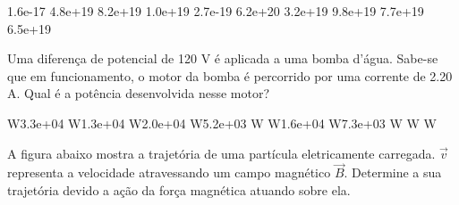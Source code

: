 \documentclass[12pt, addpoints]{exam}
\begin{document}
\begin{questions}
\begin{multicols*}{2}
\begin{oneparchoices}
\choice 1.6e-17 \choice 4.8e+19 \choice 8.2e+19 \choice 1.0e+19 \choice 2.7e-19 \choice 6.2e+20 \choice 3.2e+19 \choice 9.8e+19 \choice 7.7e+19 \choice 6.5e+19 
\end{oneparchoices}\question Uma diferença de potencial de 120 V é aplicada a uma bomba d’água. Sabe-se que em funcionamento, o motor da bomba é percorrido por uma corrente de    2.20 A. Qual é a potência desenvolvida nesse motor?

\begin{oneparchoices}
 W\choice 3.3e+04 W\choice 1.3e+04 W\choice 2.0e+04 W\choice 5.2e+03 W W\choice 1.6e+04 W\choice 7.3e+03 W W W
\end{oneparchoices}\question A ﬁgura abaixo mostra a trajetória de uma partícula eletricamente carregada. $\vec{{v}}$ representa a velocidade atravessando um campo magnético $\vec{{B}}$. Determine a sua trajetória devido a ação da força magnética atuando sobre ela.
        
        \begin{center}
            \begin{minipage}[c]{0.5\linewidth}
            \end{minipage}
        \end{center}

        


\end{multicols*}
\end{questions}
\end{document}
